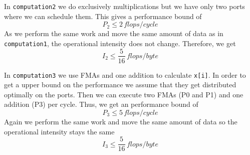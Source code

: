 \documentclass[a4paper]{article}
\begin{document}
\begin{enumerate}
\begin{enumerate}
                In \verb|computation2| we do exclusively multiplications but we have
                only two ports where we can schedule them. This gives
                a performance bound of
                \begin{equation*}
                    P_2 \leq 2 \, flops/cycle
                \end{equation*}
                As we perform the same work and move the same amount of data as
                in \verb|computation1|, the operational intensity does not
                change. Therefore, we get
                \begin{equation*}
                    I_2 \leq \frac{5}{16} \, flops/byte
                \end{equation*}

                In \verb|computation3| we use FMAs and one addition to
                calculate \verb|x[i]|. In order to get a upper bound on the
                performance we assume that they get distributed optimally on
                the ports. Then we can execute two FMAs (P0 and P1) and one
                addition (P3) per cycle. Thus, we get an performance bound of
                \begin{equation*}
                    P_3 \leq 5 \, flops/cycle
                \end{equation*}
                Again we perform the same work and move the same amount of data
                so the operational intensity stays the same
                \begin{equation*}
                    I_3 \leq \frac{5}{16} \, flops/byte
                \end{equation*}
                

\end{enumerate}
\end{enumerate}
\end{document}

